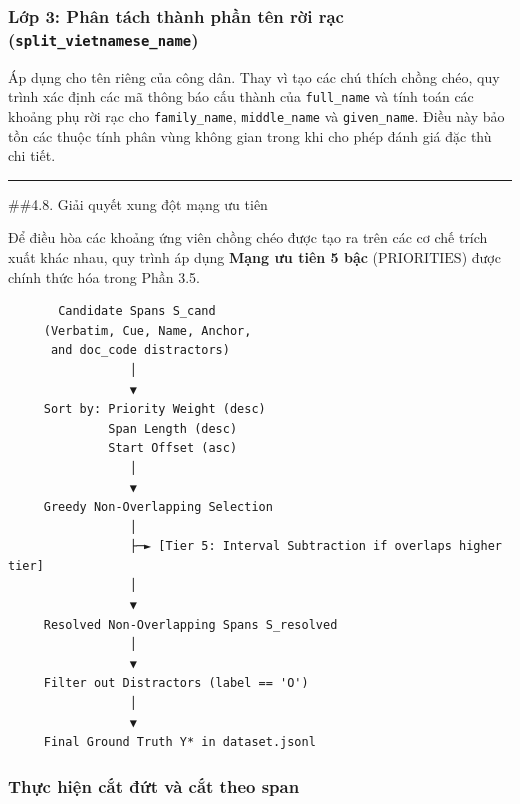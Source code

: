 \documentclass[
  11pt,
  a4paper,
]{article}
\begin{document}
\subsubsection{\texorpdfstring{Lớp 3: Phân tách thành phần tên rời rạc
(\texttt{split\_vietnamese\_name})}{Lớp 3: Phân tách thành phần tên rời rạc (split\_vietnamese\_name)}}\label{lux1edbp-3-phuxe2n-tuxe1ch-thuxe0nh-phux1ea7n-tuxean-rux1eddi-rux1ea1c-split_vietnamese_name}

Áp dụng cho tên riêng của công dân. Thay vì tạo các chú thích chồng
chéo, quy trình xác định các mã thông báo cấu thành của
\texttt{full\_name} và tính toán các khoảng phụ rời rạc cho
\texttt{family\_name}, \texttt{middle\_name} và \texttt{given\_name}.
Điều này bảo tồn các thuộc tính phân vùng không gian trong khi cho phép
đánh giá đặc thù chi tiết.

\begin{center}\rule{0.5\linewidth}{0.5pt}\end{center}

\#\#4.8. Giải quyết xung đột mạng ưu tiên

Để điều hòa các khoảng ứng viên chồng chéo được tạo ra trên các cơ chế
trích xuất khác nhau, quy trình áp dụng \textbf{Mạng ưu tiên 5 bậc}
(\(\text{PRIORITIES}\)) được chính thức hóa trong Phần 3.5.

\begin{verbatim}
       Candidate Spans S_cand
     (Verbatim, Cue, Name, Anchor,
      and doc_code distractors)
                 │
                 ▼
     Sort by: Priority Weight (desc)
              Span Length (desc)
              Start Offset (asc)
                 │
                 ▼
     Greedy Non-Overlapping Selection
                 │
                 ├─► [Tier 5: Interval Subtraction if overlaps higher tier]
                 │
                 ▼
     Resolved Non-Overlapping Spans S_resolved
                 │
                 ▼
     Filter out Distractors (label == 'O')
                 │
                 ▼
     Final Ground Truth Y* in dataset.jsonl
\end{verbatim}

\subsubsection{Thực hiện cắt đứt và cắt theo
span}\label{thux1ef1c-hiux1ec7n-cux1eaft-ux111ux1ee9t-vuxe0-cux1eaft-theo-span}
\end{document}
